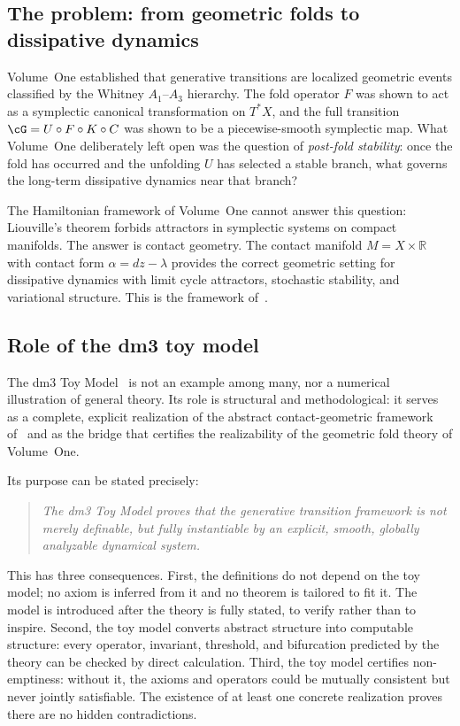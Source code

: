 \documentclass[12pt, oneside]{book}
\theoremstyle{plain}
\theoremstyle{definition}
\theoremstyle{remark}
\newcommand{\R}{\mathbb{R}}
\begin{document}
\subsection{The problem: from geometric folds to dissipative dynamics}

Volume~One established that generative transitions are localized
geometric events classified by the Whitney $A_1$--$A_3$ hierarchy.
The fold operator $F$ was shown to act as a symplectic canonical
transformation on $T^*X$, and the full transition
$\cG = U\circ F\circ K\circ C$ was shown to be a piecewise-smooth
symplectic map. What Volume~One deliberately left open was the
question of \emph{post-fold stability}: once the fold has occurred
and the unfolding $U$ has selected a stable branch, what governs
the long-term dissipative dynamics near that branch?

The Hamiltonian framework of Volume~One cannot answer this question:
Liouville's theorem forbids attractors in symplectic systems on
compact manifolds. The answer is contact geometry. The contact
manifold $M = X\times\R$ with contact form $\alpha = dz - \lambda$
provides the correct geometric setting for dissipative dynamics
with limit cycle attractors, stochastic stability, and variational
structure. This is the framework of~\cite{Paper1}.

\subsection{Role of the dm3 toy model}
\label{subsec:toymodel-role}

The dm3 Toy Model~\cite{Paper2} is not an example among many,
nor a numerical illustration of general theory. Its role is
structural and methodological: it serves as a complete, explicit
realization of the abstract contact-geometric framework of~\cite{Paper1}
and as the bridge that certifies the realizability of the geometric
fold theory of Volume~One.

Its purpose can be stated precisely:

\begin{quote}
\emph{The dm3 Toy Model proves that the generative transition
framework is not merely definable, but fully instantiable by an
explicit, smooth, globally analyzable dynamical system.}
\end{quote}

This has three consequences. First, the definitions do not depend
on the toy model; no axiom is inferred from it and no theorem is
tailored to fit it. The model is introduced after the theory is
fully stated, to verify rather than to inspire. Second, the toy
model converts abstract structure into computable structure: every
operator, invariant, threshold, and bifurcation predicted by the
theory can be checked by direct calculation. Third, the toy model
certifies non-emptiness: without it, the axioms and operators could
be mutually consistent but never jointly satisfiable. The existence
of at least one concrete realization proves there are no hidden
contradictions.
\end{document}
